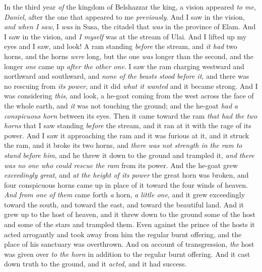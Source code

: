 \begin{biblechapter} %
 In the third year \textit{of} the kingdom of Belshazzar the king, a vision appeared \textit{to me, Daniel}, after the one that appeared to me \textit{previously}.
\verse And I saw in the vision, \textit{and when I saw}, I \textit{was} in Susa, the citadel that \textit{was} in the province of Elam. And I saw in the vision, and \textit{I myself} was at the stream of Ulai.
\verse And I lifted up my eyes and I saw, and look! A ram standing \textit{before} the stream, and \textit{it had} two horns, and the horns \textit{were} long, but the one \textit{was} longer than the second, and the longer \textit{one} came up \textit{after the other one}.
\verse I saw the ram charging westward and northward and southward, and \textit{none of the beasts stood before it}, and there was no rescuing from \textit{its power}, and it did \textit{what it wanted} and it became strong.
\verse And I was considering \textit{this}, and look, a he-goat coming from the west across the face of the whole earth, and \textit{it} was not touching the ground; and the he-goat \textit{had} \textit{a conspicuous horn} between its eyes.
\verse Then it came toward the ram \textit{that had the two horns} that I saw standing \textit{before} the stream, and it ran at it with the rage of its power.
\verse And I saw it approaching the ram and it was furious at it, and it struck the ram, and it broke its two horns, and \textit{there was not strength in the ram to stand before him}, and he threw it down to the ground and trampled it, \textit{and there was no one who could rescue the ram} from its power.
\verse And the he-goat grew \textit{exceedingly great}, and \textit{at the height of its power} the great horn was broken, and four conspicuous horns came up in place of it toward the four winds of heaven.
\verse \textit{And from one of them} came forth \textit{a} horn, \textit{a little one}, and it grew exceedingly toward the south, and toward the east, and toward the beautiful land.
\verse And it grew up to the host of heaven, and it threw down to the ground some of the host and some of the stars and trampled them.
\verse Even against the prince of the hosts it acted arrogantly and took away from him the regular burnt offering, and the place of his sanctuary was overthrown.
\verse And on account of transgression, \textit{the} host was given over \textit{to the horn} in addition to the regular burnt offering. And it cast down truth to the ground, and it \textit{acted}, and it had success.

\end{biblechapter}
